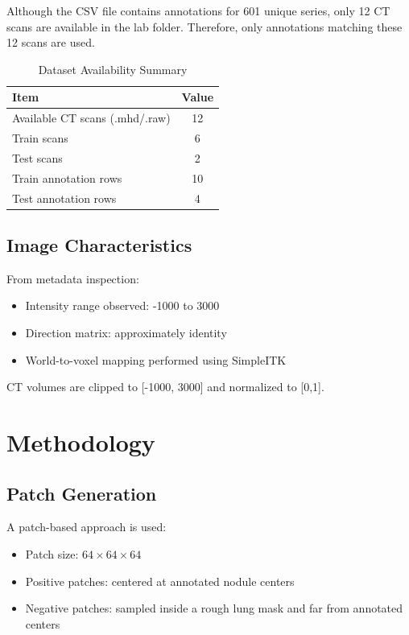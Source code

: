 \documentclass[conference]{IEEEtran}
\begin{document}
Although the CSV file contains annotations for 601 unique series, only 12 CT scans are available in the lab folder. Therefore, only annotations matching these 12 scans are used.

\begin{table}[H]
\centering
\caption{Dataset Availability Summary}
\begin{tabular}{lc}
\toprule
Item & Value \\
\midrule
Available CT scans (.mhd/.raw) & 12 \\
Train scans & 6 \\
Test scans & 2 \\
Train annotation rows & 10 \\
Test annotation rows & 4 \\
\bottomrule
\end{tabular}
\end{table}

\subsection{Image Characteristics}

From metadata inspection:

\begin{itemize}
    \item Intensity range observed: -1000 to 3000
    \item Direction matrix: approximately identity
    \item World-to-voxel mapping performed using SimpleITK
\end{itemize}

CT volumes are clipped to [-1000, 3000] and normalized to [0,1].

\section{Methodology}

\subsection{Patch Generation}

A patch-based approach is used:

\begin{itemize}
    \item Patch size: $64 \times 64 \times 64$
    \item Positive patches: centered at annotated nodule centers
    \item Negative patches: sampled inside a rough lung mask and far from annotated centers
\end{itemize}
\end{document}
